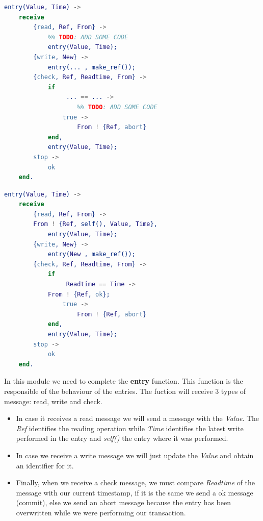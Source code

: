 \documentclass[a4paper, 10pt]{article}
\begin{document}
    \begin{minipage}{.45\textwidth}
	\begin{lstlisting}[language=erlang, caption={Template}]
entry(Value, Time) ->
    receive
        {read, Ref, From} ->
            %% TODO: ADD SOME CODE
            entry(Value, Time);
        {write, New} ->
            entry(... , make_ref()); 
        {check, Ref, Readtime, From} ->
            if 
                 ... == ... ->  
                    %% TODO: ADD SOME CODE
                true ->
                    From ! {Ref, abort}
            end,
            entry(Value, Time);
        stop ->
            ok
    end.
 	\end{lstlisting}
    \end{minipage}\hfill
    \begin{minipage}{.45\textwidth}
	\begin{lstlisting}[language=erlang, caption={Filled version}]
entry(Value, Time) ->
    receive
        {read, Ref, From} ->
	    From ! {Ref, self(), Value, Time},
            entry(Value, Time);
        {write, New} ->
            entry(New , make_ref());
        {check, Ref, Readtime, From} ->
            if 
                 Readtime == Time -> 
		    From ! {Ref, ok};
                true ->
                    From ! {Ref, abort}
            end,
            entry(Value, Time);
        stop ->
            ok
    end.
  	\end{lstlisting}
  \end{minipage}

In this module we need to complete the \textbf{entry} function. This function is the responsible of the behaviour of the entries. The fuction will receive 3 types of message: read, write and check. 

\begin{itemize}
    \item  In case it receives a read message we will send a message with the \textit{Value}. The \textit{Ref} identifies the reading operation while \textit{Time} identifies the latest write performed in the entry and \textit{self()} the entry where it was performed.
  \item In case we receive a write message we will just update the \textit{Value} and obtain an identifier for it. 
  \item Finally, when we receive a check message, we must compare \textit{Readtime} of the message with our current timestamp, if it is the same we send a ok message (commit), else we send an abort message because the entry has been overwritten while we were performing our transaction.
\end{itemize}
\end{document}
